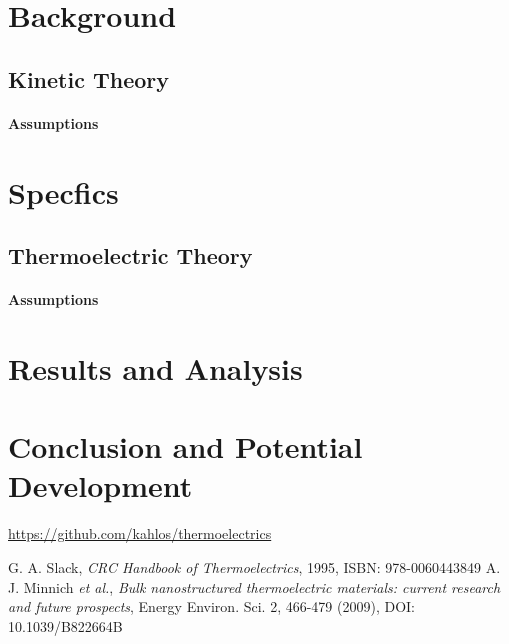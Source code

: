 \documentclass[12pt]{article}
\begin{document}
\section{Background}
\subsection{Kinetic Theory}
\paragraph{Assumptions}

\section{Specfics}
\subsection{Thermoelectric Theory}
\paragraph{Assumptions}

\section{Results and Analysis}

\section{Conclusion and Potential Development}

\url{https://github.com/kahlos/thermoelectrics}


\begin{thebibliography}{}
G. A. Slack, \emph{CRC Handbook of Thermoelectrics}, 1995, ISBN: 978-0060443849
A. J. Minnich \emph{et al.}, \emph{Bulk nanostructured thermoelectric
materials: current research and future prospects}, Energy Environ.
Sci. 2, 466-479 (2009), DOI: 10.1039/B822664B
\end{thebibliography}
\end{document}
